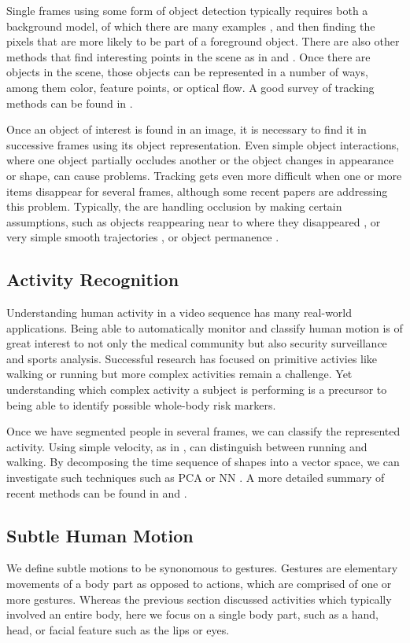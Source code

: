 \documentclass[11pt]{article}
\begin{document}
Single frames using some form of object detection typically requires both a background model, of which there are many examples \cite{Elgammal} \cite{Stauffer}, and then finding the pixels that are more likely to be part of a foreground object. There are also other methods that find interesting points in the scene as in \cite{tomasi1991} and \cite{lowe2004}. Once there are objects in the scene, those objects can be represented in a number of ways, among them color, feature points, or optical flow. A good survey of tracking methods can be found in \cite{yilmaz2006}.

Once an object of interest is found in an image, it is necessary to find it in successive frames using its object representation. Even simple object interactions, where one object partially occludes another or the object changes in appearance or shape, can cause problems. Tracking gets even more difficult when one or more items disappear for several frames, although some recent papers are addressing this problem. Typically, the are handling occlusion by making certain assumptions, such as objects reappearing near to where they disappeared \cite{papadourakis2010}, or very simple smooth trajectories \cite{iraei2015}, or object permanence \cite{huang2005}.

\subsection{Activity Recognition}
Understanding human activity in a video sequence has many real-world applications. Being able to automatically monitor and classify human motion is of great interest to not only the medical community but also security surveillance and sports analysis. Successful research has focused on primitive activies like walking or running but more complex activities remain a challenge. Yet understanding which complex activity a subject is performing is a precursor to being able to identify possible whole-body risk markers.

Once we have segmented people in several frames, we can classify the represented activity. Using simple velocity, as in \cite{bodor2003}, can distinguish between running and walking. By decomposing the time sequence of shapes into a vector space, we can investigate such techniques such as PCA \cite{masoud2003} or NN \cite{blank2005}. A more detailed summary of recent methods can be found in \cite{poppe2010} and \cite{aggarwal2011}.

\subsection{Subtle Human Motion}
We define subtle motions to be synonomous to gestures. Gestures are elementary movements of a body part as opposed to actions, which are comprised of one or more gestures. Whereas the previous section discussed activities which typically involved an entire body, here we focus on a single body part, such as a hand, head, or facial feature such as the lips or eyes.
\end{document}
